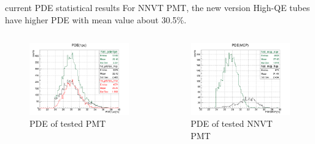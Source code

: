 \documentclass[11pt,compress,xcolor=x11names,UTF8]{beamer}
\begin{document}
\begin{frame}{current PDE statistical results}
For NNVT PMT, the new version High-QE tubes have higher PDE with mean value about 30.5\%.
\begin{columns}
\begin{column}{.5\textwidth}
\begin{figure}
\centering
\includegraphics[width=\textwidth]{figures/pde1pe.png} %
\caption{PDE of tested PMT}
\end{figure}
\end{column}
\begin{column}{.5\textwidth}
\begin{figure}
\centering
\includegraphics[width=\textwidth]{figures/pdemcp.png} %
\caption{PDE of tested NNVT PMT}
\end{figure}
\end{column}
\end{columns}
\end{frame}
\end{document}
